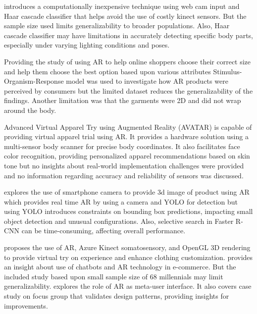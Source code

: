 
		\cite[]{hashmi2020augmented}{
			introduces a computationally inexpensive technique using web cam input and Haar cascade classifier \cite{DBLP:conf/cvpr/ViolaJ01} that helps avoid the use of costly kinect sensors. But the sample size used limits generalizability to broader populations. Also, Haar cascade classifier may have limitations in accurately detecting specific body parts, especially under varying lighting conditions and poses.
		}

        Providing the study of using AR to help online shoppers choose their correct size and help them choose the best option based upon various attributes Stimulus-Organism-Response model \cite{baytar2020evaluating} was used to investigate how AR products were perceived by consumers but the limited dataset reduces the generalizability of the findings. Another limitation was that the garments were 2D and did not wrap around the body.

        Advanced Virtual Apparel Try using Augmented Reality (AVATAR) \cite{shaw2020advanced} is capable of providing virtual apparel trial using AR. It provides a hardware solution using a multi-sensor body scanner for precise body coordinates. It also facilitates face color recognition, providing personalized apparel recommendations based on skin tone but no insights about real-world implementation challenges were provided and no information regarding accuracy and reliability of sensors was discussed.

		\cite[]{ali2021augmented} explores the use of smartphone camera to provide 3d image of product using AR which provides real time AR by using a camera and YOLO for detection but using YOLO introduces constraints on bounding box predictions, impacting small object detection and unusual configurations. Also, selective search in Faster R-CNN \cite{DBLP:journals/pami/RenHG017} can be time-consuming, affecting overall performance.

		\cite[]{feng2021personalized} proposes the use of AR, Azure Kinect somatosensory, and OpenGL 3D rendering to provide virtual try on experience and enhance clothing customization. \cite[]{moriuchi2021engagement} provides an insight about use of chatbots and AR technology in e-commerce. But the included study based upon small sample size of 68 millennials may limit generalizability. \cite[]{DBLP:journals/sensors/BattistoniGRSVB22} explores the role of AR as meta-user interface. It also covers case study on focus group that validates design patterns, providing insights for improvements.

